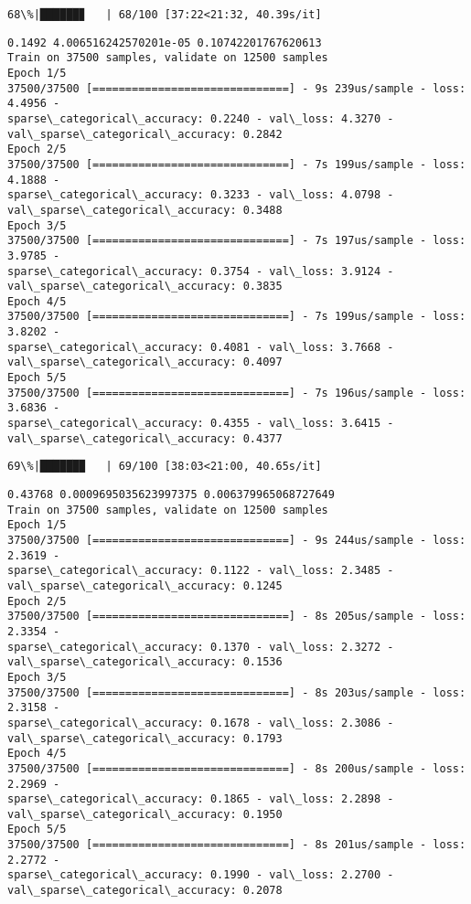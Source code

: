 \documentclass[11pt]{article}
\begin{document}
    \begin{Verbatim}[commandchars=\\\{\}]
 68\%|██████▊   | 68/100 [37:22<21:32, 40.39s/it]
    \end{Verbatim}

    \begin{Verbatim}[commandchars=\\\{\}]
0.1492 4.006516242570201e-05 0.10742201767620613
Train on 37500 samples, validate on 12500 samples
Epoch 1/5
37500/37500 [==============================] - 9s 239us/sample - loss: 4.4956 -
sparse\_categorical\_accuracy: 0.2240 - val\_loss: 4.3270 -
val\_sparse\_categorical\_accuracy: 0.2842
Epoch 2/5
37500/37500 [==============================] - 7s 199us/sample - loss: 4.1888 -
sparse\_categorical\_accuracy: 0.3233 - val\_loss: 4.0798 -
val\_sparse\_categorical\_accuracy: 0.3488
Epoch 3/5
37500/37500 [==============================] - 7s 197us/sample - loss: 3.9785 -
sparse\_categorical\_accuracy: 0.3754 - val\_loss: 3.9124 -
val\_sparse\_categorical\_accuracy: 0.3835
Epoch 4/5
37500/37500 [==============================] - 7s 199us/sample - loss: 3.8202 -
sparse\_categorical\_accuracy: 0.4081 - val\_loss: 3.7668 -
val\_sparse\_categorical\_accuracy: 0.4097
Epoch 5/5
37500/37500 [==============================] - 7s 196us/sample - loss: 3.6836 -
sparse\_categorical\_accuracy: 0.4355 - val\_loss: 3.6415 -
val\_sparse\_categorical\_accuracy: 0.4377
    \end{Verbatim}

    \begin{Verbatim}[commandchars=\\\{\}]
 69\%|██████▉   | 69/100 [38:03<21:00, 40.65s/it]
    \end{Verbatim}

    \begin{Verbatim}[commandchars=\\\{\}]
0.43768 0.0009695035623997375 0.006379965068727649
Train on 37500 samples, validate on 12500 samples
Epoch 1/5
37500/37500 [==============================] - 9s 244us/sample - loss: 2.3619 -
sparse\_categorical\_accuracy: 0.1122 - val\_loss: 2.3485 -
val\_sparse\_categorical\_accuracy: 0.1245
Epoch 2/5
37500/37500 [==============================] - 8s 205us/sample - loss: 2.3354 -
sparse\_categorical\_accuracy: 0.1370 - val\_loss: 2.3272 -
val\_sparse\_categorical\_accuracy: 0.1536
Epoch 3/5
37500/37500 [==============================] - 8s 203us/sample - loss: 2.3158 -
sparse\_categorical\_accuracy: 0.1678 - val\_loss: 2.3086 -
val\_sparse\_categorical\_accuracy: 0.1793
Epoch 4/5
37500/37500 [==============================] - 8s 200us/sample - loss: 2.2969 -
sparse\_categorical\_accuracy: 0.1865 - val\_loss: 2.2898 -
val\_sparse\_categorical\_accuracy: 0.1950
Epoch 5/5
37500/37500 [==============================] - 8s 201us/sample - loss: 2.2772 -
sparse\_categorical\_accuracy: 0.1990 - val\_loss: 2.2700 -
val\_sparse\_categorical\_accuracy: 0.2078
    \end{Verbatim}
\end{document}
